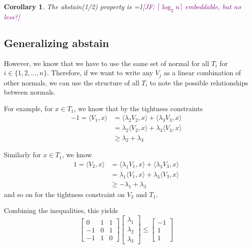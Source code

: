 \documentclass[12pt]{article}
\newcommand{\Comments}{1}
\newcommand{\mynote}[2]{\ifnum\Comments=1\textcolor{#1}{#2}\fi}
\newcommand{\jessie}[1]{\mynote{purple}{[JF: #1]}}
\newcommand{\inprod}[2]{\langle #1, #2 \rangle}
\newtheorem{corollary}{Corollary}
\begin{document}
  \begin{corollary}
    The abstain(1/2) property is \jessie{$\lceil \log_2 n \rceil$ embeddable, but no less?}
  \end{corollary}	
  
  \subsection{Generalizing abstain}
  However, we know that we have to use the same set of normal for all $T_i$ for $i \in \{1,2, \ldots, n\}$.
  Therefore, if we want to write any $V_j$ as a linear combination of other normals, we can use the structure of all $T_i$ to note the possible relationships between normals.
  
  For example, for $x \in T_1$, we know that by the tightness constraints
  \begin{align*}
  -1 = \inprod{V_1}{x} &= \inprod{\lambda_2 V_2}{x} + \inprod{\lambda_3 V_3}{x}\\ 
  &= \lambda_2 \inprod{V_2}{x} + \lambda_3 \inprod{V_3}{x}\\
  &\geq \lambda_2 + \lambda_3
  \end{align*}
  
  Similarly for $x \in T_1$, we know
  \begin{align*}
  1 = \inprod{V_2}{x} &= \inprod{\lambda_1 V_1}{x} + \inprod{\lambda_3 V_3}{x}\\ 
  &= \lambda_1 \inprod{V_1}{x} + \lambda_3 \inprod{V_3}{x}\\
  &\geq -\lambda_1 + \lambda_3
  \end{align*}
  and so on for the tightness constraint on $V_3$ and $T_1$.
  
  Combining the inequalities, this yields
  \[
  \begin{bmatrix}
      0 & 1 & 1      \\
      -1 & 0 & 1 \\
      -1 & 1 & 0      
  \end{bmatrix}
  \begin{bmatrix}
      \lambda_1\\
      \lambda_2\\
      \lambda_3
  \end{bmatrix}
  \leq 
  \begin{bmatrix}
      -1\\
      1 \\
      1
  \end{bmatrix} 
  \]
  
\end{document}
